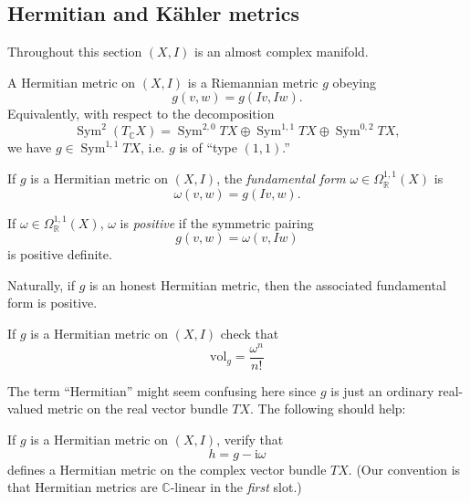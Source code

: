 \documentclass[12pt,letterpaper,reqno]{article}
\numberwithin{equation}{section}
\newcommand{\R}{\ensuremath{\mathbb R}}
\newcommand{\C}{\ensuremath{\mathbb C}}
\newcommand{\kahler}{K\"ahler\xspace}
\newcommand{\I}{{\mathrm i}}
\newcommand{\ti}[1]{\textit{#1}}
\DeclareMathOperator{\Sym}{Sym}
\begin{document}
\subsection{Hermitian and \kahler metrics}
Throughout this section $(X,I)$ is an almost complex manifold.

\begin{defn} A Hermitian metric on
$(X,I)$ is a Riemannian metric $g$ obeying
$$ g(v,w) = g(Iv,Iw). $$
Equivalently, with respect to the decomposition
\begin{equation}
  \Sym^2 (T_\C X) = \Sym^{2,0} TX \oplus \Sym^{1,1} TX \oplus \Sym^{0,2} TX,
\end{equation}
we have $g \in \Sym^{1,1} TX$, i.e. $g$ is of ``type $(1,1)$.''
\end{defn}

\begin{defn} If $g$ is a Hermitian metric on $(X,I)$,
the \ti{fundamental form} $\omega \in \Omega^{1,1}_\R(X)$
is
\begin{equation}
  \omega(v,w) = g(Iv,w).
\end{equation}
\end{defn}

\begin{defn} If $\omega \in \Omega^{1,1}_\R(X)$,
$\omega$ is \ti{positive} if the symmetric pairing
\begin{equation}
   g(v,w) = \omega(v,Iw)
\end{equation}
is positive definite.
\end{defn}

Naturally, if $g$ is an honest Hermitian metric, then the
associated fundamental form is positive.

\begin{exercise} If $g$ is a Hermitian metric on $(X,I)$ check that
\begin{equation}
  {\mathrm {vol}}_g = \frac{\omega^n}{n!}
\end{equation}
\end{exercise}

The term ``Hermitian'' might seem confusing here since $g$ is just
an ordinary real-valued metric on the real vector bundle
$TX$. The following should help:

\begin{exercise} \label{exc:hermitian-metric}
If $g$ is a Hermitian metric on $(X,I)$,
verify that
\begin{equation}
  h = g - \I \omega
\end{equation}
defines a Hermitian metric
on the complex vector bundle $TX$.
(Our convention is that Hermitian metrics are
$\C$-linear in the \ti{first} slot.)
\end{exercise}
\end{document}
